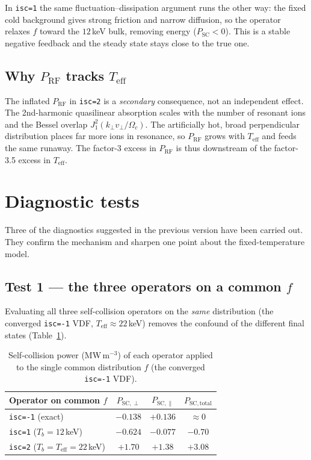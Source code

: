 \documentclass[11pt,a4paper]{article}
\begin{document}
In \texttt{isc=1} the same fluctuation--dissipation argument runs the other
way: the fixed cold background gives strong friction and narrow diffusion, so
the operator relaxes $f$ toward the $12$\,keV bulk, removing energy
($P_\text{SC} < 0$). This is a stable negative feedback and the steady state
stays close to the true one.

\subsection{Why \texorpdfstring{$P_\text{RF}$}{P\_RF} tracks \texorpdfstring{$T_\text{eff}$}{Teff}}

The inflated $P_\text{RF}$ in \texttt{isc=2} is a \emph{secondary}
consequence, not an independent effect. The 2nd-harmonic quasilinear
absorption scales with the number of resonant ions and the Bessel overlap
$J_1^2(k_\perp v_\perp/\Omega_c)$. The artificially hot, broad perpendicular
distribution places far more ions in resonance, so $P_\text{RF}$ grows with
$T_\text{eff}$ and feeds the same runaway. The factor-3 excess in
$P_\text{RF}$ is thus downstream of the factor-3.5 excess in $T_\text{eff}$.

\section{Diagnostic tests}
\label{sec:tests}

Three of the diagnostics suggested in the previous version have been carried
out. They confirm the mechanism and sharpen one point about the
fixed-temperature model.

\subsection{Test 1 --- the three operators on a common \texorpdfstring{$f$}{f}}

Evaluating all three self-collision operators on the \emph{same} distribution
(the converged \texttt{isc=-1} VDF, $T_\text{eff}\approx22$\,keV) removes the
confound of the different final states (Table~\ref{tab:commonf}).

\begin{table}[h]
\centering
\caption{Self-collision power (MW\,m$^{-3}$) of each operator applied to the
  single common distribution $f$ (the converged \texttt{isc=-1} VDF).}
\label{tab:commonf}
\begin{tabular}{lccc}
\toprule
Operator on common $f$ & $P_{\mathrm{SC},\perp}$ & $P_{\mathrm{SC},\parallel}$ & $P_{\mathrm{SC,total}}$ \\
\midrule
\texttt{isc=-1} (exact)                      & $-0.138$ & $+0.136$ & $\approx 0$ \\
\texttt{isc=1} ($T_b=12$\,keV)               & $-0.624$ & $-0.077$ & $-0.70$ \\
\texttt{isc=2} ($T_b=T_\text{eff}=22$\,keV)  & $+1.70$  & $+1.38$  & $+3.08$ \\
\bottomrule
\end{tabular}
\end{table}
\end{document}

